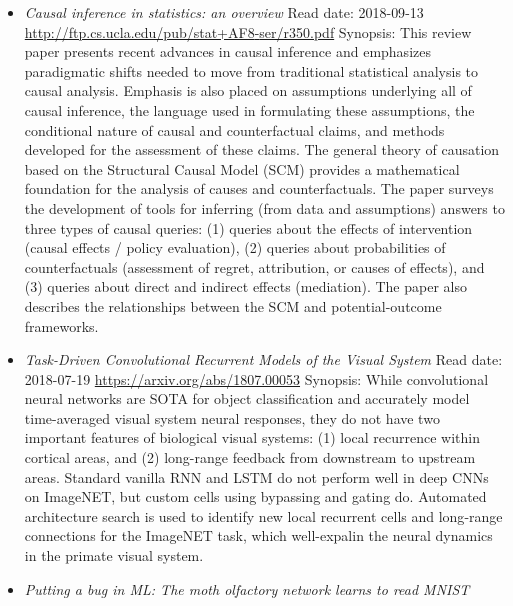 \documentclass{article}%
\begin{document}
\begin{itemize}
\item%
\textit{Causal inference in statistics: an overview}%
\newline%
Read date: 2018{-}09{-}13%
\newline%
\href{http://ftp.cs.ucla.edu/pub/stat+AF8{-}ser/r350.pdf}{http://ftp.cs.ucla.edu/pub/stat+AF8{-}ser/r350.pdf}%
\newline%
Synopsis: This review paper presents recent advances in causal inference and emphasizes paradigmatic shifts needed to move from traditional statistical analysis to causal analysis. Emphasis is also placed on assumptions underlying all of causal inference, the language used in formulating these assumptions, the conditional nature of causal and counterfactual claims, and methods developed for the assessment of these claims. The general theory of causation based on the Structural Causal Model (SCM) provides a mathematical foundation for the analysis of causes and counterfactuals. The paper surveys the development of tools for inferring (from data and assumptions) answers to three types of causal queries: (1) queries about the effects of intervention (causal effects / policy evaluation), (2) queries about probabilities of counterfactuals (assessment of regret, attribution, or causes of effects), and (3) queries about direct and indirect effects (mediation). The paper also describes the relationships between the SCM and potential{-}outcome frameworks.%
\item%
\textit{Task{-}Driven Convolutional Recurrent Models of the Visual System}%
\newline%
Read date: 2018{-}07{-}19%
\newline%
\href{https://arxiv.org/abs/1807.00053}{https://arxiv.org/abs/1807.00053}%
\newline%
Synopsis: While convolutional neural networks are SOTA for object classification and accurately model time{-}averaged visual system neural responses, they do not have two important features of biological visual systems: (1) local recurrence within cortical areas, and (2) long{-}range feedback from downstream to upstream areas. Standard vanilla RNN and LSTM do not perform well in deep CNNs on ImageNET, but custom cells using bypassing and gating do. Automated architecture search is used to identify new local recurrent cells and long{-}range connections for the ImageNET task, which well{-}expalin the neural dynamics in the primate visual system.%
\item%
\textit{Putting a bug in ML: The moth olfactory network learns to read MNIST}%

\end{itemize}
\end{document}
